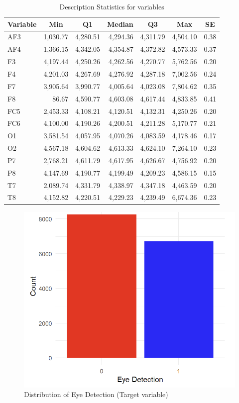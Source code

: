 \documentclass[
  doc]{apa6}
\begin{document}
\begin{table}[H]

\begin{center}
\begin{threeparttable}

\caption{\label{tab:summary-table}Description Statistics for variables}

\begin{tabular}{lrrrrrr}
\toprule
Variable & \multicolumn{1}{c}{Min} & \multicolumn{1}{c}{Q1} & \multicolumn{1}{c}{Median} & \multicolumn{1}{c}{Q3} & \multicolumn{1}{c}{Max} & \multicolumn{1}{c}{SE}\\
\midrule
AF3 & 1,030.77 & 4,280.51 & 4,294.36 & 4,311.79 & 4,504.10 & 0.38\\
AF4 & 1,366.15 & 4,342.05 & 4,354.87 & 4,372.82 & 4,573.33 & 0.37\\
F3 & 4,197.44 & 4,250.26 & 4,262.56 & 4,270.77 & 5,762.56 & 0.20\\
F4 & 4,201.03 & 4,267.69 & 4,276.92 & 4,287.18 & 7,002.56 & 0.24\\
F7 & 3,905.64 & 3,990.77 & 4,005.64 & 4,023.08 & 7,804.62 & 0.35\\
F8 & 86.67 & 4,590.77 & 4,603.08 & 4,617.44 & 4,833.85 & 0.41\\
FC5 & 2,453.33 & 4,108.21 & 4,120.51 & 4,132.31 & 4,250.26 & 0.20\\
FC6 & 4,100.00 & 4,190.26 & 4,200.51 & 4,211.28 & 5,170.77 & 0.21\\
O1 & 3,581.54 & 4,057.95 & 4,070.26 & 4,083.59 & 4,178.46 & 0.17\\
O2 & 4,567.18 & 4,604.62 & 4,613.33 & 4,624.10 & 7,264.10 & 0.23\\
P7 & 2,768.21 & 4,611.79 & 4,617.95 & 4,626.67 & 4,756.92 & 0.20\\
P8 & 4,147.69 & 4,190.77 & 4,199.49 & 4,209.23 & 4,586.15 & 0.15\\
T7 & 2,089.74 & 4,331.79 & 4,338.97 & 4,347.18 & 4,463.59 & 0.20\\
T8 & 4,152.82 & 4,220.51 & 4,229.23 & 4,239.49 & 6,674.36 & 0.23\\
\bottomrule
\end{tabular}

\end{threeparttable}
\end{center}

\end{table}

\begin{figure}[H]

{\centering \includegraphics[width=0.4\linewidth]{figure/3} 

}

\caption{Distribution of Eye Detection (Target variable)}\label{fig:unnamed-chunk-1}
\end{figure}
\end{document}
